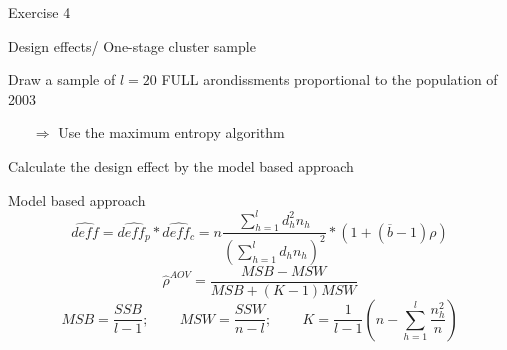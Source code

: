 \documentclass[11pt,german,hideothersubsections]{beamer}
\begin{document}
\begin{frame}[fragile]{Exercise 4}
\footnotesize{
\begin{exampleblock}{Design effects/ One-stage cluster sample}
\begin{enumerate}\footnotesize{
\item Draw a sample of $l=20$ FULL arondissments proportional to the population of 2003
\begin{itemize}
\item[$\Rightarrow$] Use the maximum entropy algorithm
\end{itemize}
\item Calculate the design effect by the model based approach
\begin{block}{Model based approach}
\begin{equation*}
\hat{deff}=\hat{deff_p} * \hat{deff_c} = n\frac{\sum_{h=1}^ld_h^2 n_h}{(\sum_{h=1}^ld_h n_h)^2}*(1+(\overline{b}-1)\rho)
\end{equation*}
\begin{equation*}
\hat{\rho}^{AOV}=\frac{MSB-MSW}{MSB+(K-1)MSW}
\end{equation*}
\begin{equation*}
MSB=\frac{SSB}{l-1}\text{;~~~~~~~}MSW=\frac{SSW}{n-l}\text{;~~~~~~~}K=\frac{1}{l-1}(n-\sum_{h=1}^l\frac{n_h^2}{n})
\end{equation*}
\end{block}
}
\end{enumerate}
\end{exampleblock}
}
\end{frame}
\end{document}
